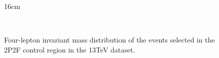 \begin{figure}[htbp]{16cm}
	\caption{Four-lepton invariant mass distribution of the events selected in the 2P2F control region in the 13TeV dataset.}
	\centering
	\\

\end{figure}
